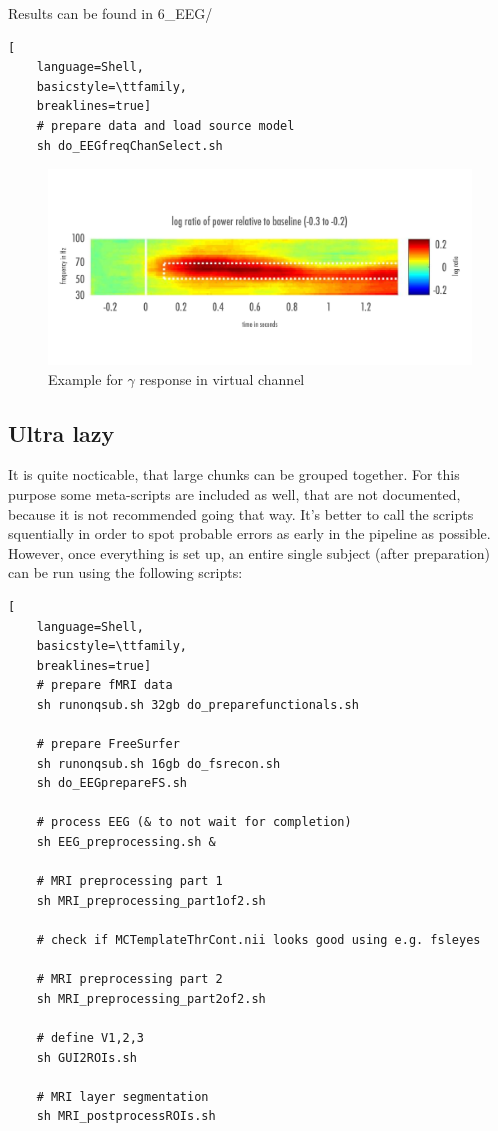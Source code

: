 \documentclass[12pt,a4paper]{scrartcl}
\begin{document}
\noindent Results can be found in 6\_EEG/\\
\begin{lstlisting}[
    language=Shell,
    basicstyle=\ttfamily,
    breaklines=true]
    # prepare data and load source model
    sh do_EEGfreqChanSelect.sh
\end{lstlisting}
\begin{figure}
\begin{center}
\includegraphics[width=1\textwidth]{exampleGamma}
\caption[Example for $\gamma$ response in virtual channel]{Example for $\gamma$ response in virtual channel}
\label{fig:exampleGamma}
\end{center}
\end{figure}

\subsection{Ultra lazy}
It is quite nocticable, that large chunks can be grouped together. For this purpose some meta-scripts are included as well, that are not documented, because it is not recommended going that way. It's better to call the scripts squentially in order to spot probable errors as early in the pipeline as possible. However, once everything is set up, an entire single subject (after preparation) can be run using the following scripts:
\begin{lstlisting}[
    language=Shell,
    basicstyle=\ttfamily,
    breaklines=true]
    # prepare fMRI data
    sh runonqsub.sh 32gb do_preparefunctionals.sh

    # prepare FreeSurfer
    sh runonqsub.sh 16gb do_fsrecon.sh
    sh do_EEGprepareFS.sh

    # process EEG (& to not wait for completion)
    sh EEG_preprocessing.sh &

    # MRI preprocessing part 1
    sh MRI_preprocessing_part1of2.sh

    # check if MCTemplateThrCont.nii looks good using e.g. fsleyes

    # MRI preprocessing part 2
    sh MRI_preprocessing_part2of2.sh

    # define V1,2,3
    sh GUI2ROIs.sh

    # MRI layer segmentation
    sh MRI_postprocessROIs.sh
\end{lstlisting}
\FloatBarrier
\end{document}

